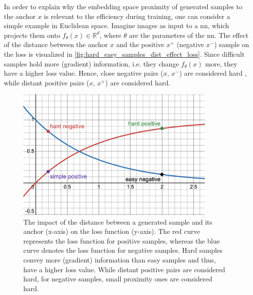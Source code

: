 In order to explain why the embedding space proximity of generated samples to the anchor $x$ 
is relevant to the efficiency during training, 
one can consider a simple example in Euclidean space.
Imagine images as input to a \ac{nn}, which projects them onto $f_{\theta}(x) \in \mathbb{R}^d$, 
where $\theta$ are the parameters of the \ac{nn}.
The effect of the distance between the anchor $x$ and the positive $x^+$ (negative $x^-$) 
sample on the loss is visualized in \autoref{fig:hard_easy_samples_dist_effect_loss}.
Since difficult samples hold more (gradient) information, 
i.e. they change $f_{\theta}(x)$ more, they have a higher loss value.
Hence, close negative pairs ($x$, $x^-$) are considered hard \citet{robinson_contrastive_2021}, 
while distant positive pairs ($x$, $x^+$) are considered hard.

%     

\begin{figure}[!htb] %
    \centering
    \includegraphics[width=280pt]{images/Hard_easy_samples_dist_effect_loss_desmos.png}
    \caption{The impact of the distance between a generated sample and its anchor (x-axis) on the loss function (y-axis).
    The red curve represents the loss function for positive samples, 
    whereas the blue curve denotes the loss function for negative samples.
    Hard samples convey more (gradient) information than easy samples and thus, have a higher loss value.
    While distant positive pairs are considered hard, for negative samples, small proximity ones are considered hard.}
    \label{fig:hard_easy_samples_dist_effect_loss}
\end{figure}